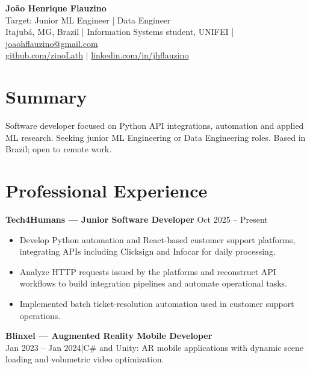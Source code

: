 \documentclass[11pt,letterpaper]{article}
\begin{document}
{\LARGE\bfseries João Henrique Flauzino}\\[3pt]
Target: Junior ML Engineer | Data Engineer\\[3pt]
{\small Itajubá, MG, Brazil | Information Systems student, UNIFEI | \href{mailto:joaohflauzino@gmail.com}{joaohflauzino@gmail.com}\\
\href{https://github.com/zinoLath}{github.com/zinoLath} | \href{https://www.linkedin.com/in/jhflauzino/}{linkedin.com/in/jhflauzino}}

\section{Summary}
Software developer focused on Python API integrations, automation and applied ML research. Seeking junior ML Engineering or Data Engineering roles. Based in Brazil; open to remote work.

\section{Professional Experience}
\textbf{Tech4Humans — Junior Software Developer} \hfill Oct 2025 -- Present
\begin{itemize}
\item Develop Python automation and React-based customer support platforms, integrating APIs including Clicksign and Infocar for daily processing.
\item Analyze HTTP requests issued by the platforms and reconstruct API workflows to build integration pipelines and automate operational tasks.
\item Implemented batch ticket-resolution automation used in customer support operations.
\end{itemize}
\textbf{Blinxel — Augmented Reality Mobile Developer}\\
Jan 2023 -- Jan 2024\quad |\quad C\# and Unity: AR mobile applications with dynamic scene loading and volumetric video optimization.
\end{document}
